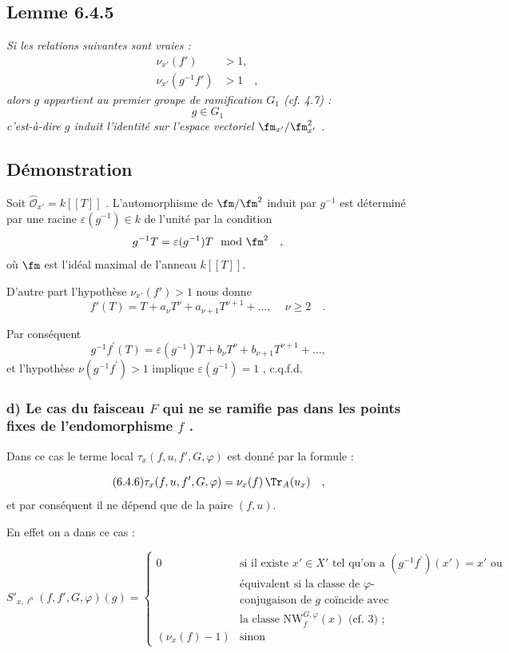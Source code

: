 \subsection*{Lemme 6.4.5}
\emph{Si les relations suivantes sont vraies :}
\begin{align*}
\nu_{x'}(f') &> 1 \text{,} \\
\nu_{x'}(g^{-1}f') &> 1 \quad ,
\end{align*}
\emph{alors $g$ appartient au premier groupe de ramification $G_1$ (cf. 4.7) :}
\[
g \in G_1
\]
\emph{c'est-à-dire $g$ induit l'identité sur l'espace vectoriel $\fm_{x'}/\fm_{x'}^2$ .}

\subsection*{Démonstration}
Soit $\widehat{\mathcal{O}}_{x'} = k[[T]]$ . L'automorphisme de $\fm/\fm^2$ induit par $g^{-1}$ est déterminé par une racine $\varepsilon(g^{-1}) \in k$ de l'unité par la condition
\[
g^{-1}T = \varepsilon(g^{-1})T \mod \fm^2 \quad ,
\]
où $\fm$ est l'idéal maximal de l'anneau $k[[T]]$.

D'autre part l'hypothèse $\nu_{x'}(f') > 1$ nous donne
\[
f'(T) = T + a_\nu T^\nu + a_{\nu+1} T^{\nu+1} + \ldots \text{, } \quad \nu \geq 2 \quad .
\]

Par conséquent
\[
g^{-1}f^{\prime}(T) = \varepsilon(g^{-1})T + b_\nu T^\nu + b_{\nu+1} T^{\nu+1} + \ldots \text{,}
\]
et l'hypothèse $\nu(g^{-1}f^{\prime}) > 1$ implique $\varepsilon(g^{-1}) = 1$ , c.q.f.d.

\subsubsection*{d) Le cas du faisceau $F$ qui ne se ramifie pas dans les points fixes de l'endomorphisme $f$ .}

Dans ce cas le terme local $\tau_x(f,u, f', G, \varphi)$ est donné par la formule :

\begin{equation}\tag{6.4.6}
\tau_x(f,u, f', G, \varphi) = \nu_x(f) \, \Tr_A(u_x) \quad ,
\end{equation}
et par conséquent il ne dépend que de la paire $(f,u)$.

En effet on a dans ce cas :

\begin{equation}\tag{6.4.7}
S'_{x,\ell^n}(f, f', G, \varphi)(g) = \begin{cases}
0 & \text{si il existe } x' \in X' \text{ tel qu'on a } (g^{-1}f^{\prime})(x') = x' \text{ ou}\\
& \text{équivalent si la classe de $\varphi$-}\\
& \text{conjugaison de $g$ coïncide avec}\\
& \text{la classe } \mathrm{NW}_{f}^{G,\varphi}(x) \text{ (cf. 3) ;}\\
(\nu_x(f)-1) & \text{sinon}
\end{cases}
\end{equation}

